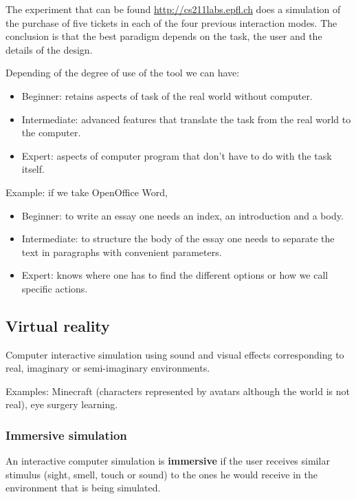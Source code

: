 The experiment that can be found \url{http://cs211labs.epfl.ch} does a simulation of the purchase of five tickets in each of the four previous interaction modes. The conclusion is that the best paradigm depends on the task, the user and the details of the design. 

Depending of the degree of use of the tool we can have:

\begin{itemize}
\item Beginner: retains aspects of task of the real world without computer.
\item Intermediate: advanced features that translate the task from the real world to the computer.
\item Expert: aspects of computer program that don't have to do with the task itself.
\end{itemize}

Example: if we take OpenOffice Word, 

\begin{itemize}
\item Beginner: to write an essay one needs an index, an introduction and a body.
\item Intermediate: to structure the body of the essay one needs to separate the text in paragraphs with convenient parameters.
\item Expert: knows where one has to find the different options or how we call specific actions.
\end{itemize}

\subsection{Virtual reality}

Computer interactive simulation using sound and visual effects corresponding to real, imaginary or semi-imaginary environments.

Examples: Minecraft (characters represented by avatars although the world is not real), eye surgery learning.

\subsubsection{Immersive simulation}

An interactive computer simulation is \textbf{immersive} if the user receives similar stimulus (sight, smell, touch or sound) to the ones he would receive in the environment that is being simulated. 

